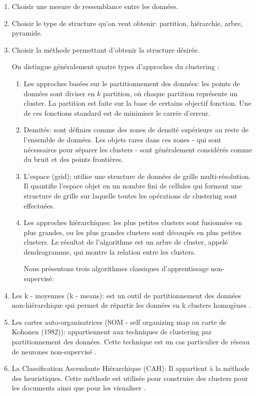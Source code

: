 \documentclass[12pt]{article}
\begin{document}
\begin{enumerate}
	\item Choisir une mesure de ressemblance entre les données.
	\item Choisir le type de structure qu'on veut obtenir: partition, hiérarchie, arbre, pyramide.
	\item Choisir la méthode permettant d'obtenir la structure désirée.
	
On distingue généralement quatre types d'approches du clustering \cite{4}:
	\begin{enumerate}
	\item Les approches basées sur le partitionnement des données: les points de données sont diviser en $k$ partition, où chaque partition représente un cluster. La partition est faite sur la base de certains objectif fonction. Une de ces fonctions standard est de minimiser le carrée d’erreur.
	\item Densités: sont définies comme des zones de densité supérieure au reste de l’ensemble de données. Les objets rares dans ces zones - qui sont nécessaires pour séparer les clusters - sont généralement considérés comme du bruit et des points frontières.	
	\item L'espace (grid): utilise une structure de données de grille multi-résolution. Il quantifie l'espace objet en un nombre fini de cellules qui forment une structure de grille sur laquelle toutes les opérations de clustering sont effectuées.
	\item Les approches hiérarchiques: les plus petites clusters sont fusionnées en plus grandes, ou les plus grandes clusters sont découpés en plus petites clusters. Le résultat de l'algorithme est un arbre de cluster, appelé dendrogramme, qui montre la relation entre les clusters.
	
Nous présentons trois algorithmes classiques d'apprentissage non-supervisé:
\end{enumerate}
		\item Les k - moyennes (k - means): est un outil de partitionnement des données non-hiérarchique qui permet de répartir les données en k clusters homogènes \cite{5}.
	\item Les cartes auto-organisatrices (SOM - self organizing map ou carte de Kohonen (1982)): appartiennent aux techniques de clustering par partitionnement des données. Cette technique est un cas particulier de réseau de neurones non-supervisé \cite{6}.
	\item La Classification Ascendante Hiérarchique (CAH): Il appartient à la méthode des heuristiques. Cette méthode est utilisée pour construire des clusters pour les documents ainsi que pour les visualiser \cite{7}.
\end{enumerate}
\end{document}
